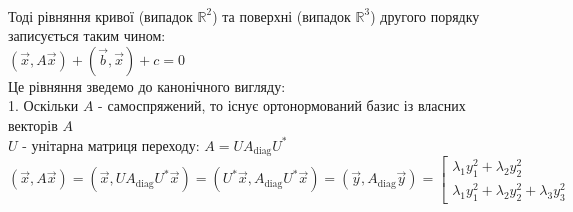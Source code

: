 \documentclass[a4paper, 14pt]{extarticle}
\def\bigline{\vspace{5mm}\\}
\begin{document}
\bigline
Тоді рівняння кривої (випадок $\mathbb{R}^2$) та поверхні (випадок $\mathbb{R}^3$) другого порядку записується таким чином:\\
$(\vec{x}, A \vec{x}) + (\vec{b}, \vec{x}) + c = 0$\\
Це рівняння зведемо до канонічного вигляду:\\
1. Оскільки $A$ - самоспряжений, то існує ортонормований базис із власних векторів $A$\\
$U$ - унітарна матриця переходу: $A = U A_{\textrm{diag}} U^*$\\
$(\vec{x}, A\vec{x}) = (\vec{x}, U A_{\textrm{diag}} U^* \vec{x}) = (U^* \vec{x}, A_{\textrm{diag}} U^* \vec{x}) = (\vec{y}, A_{\textrm{diag}} \vec{y}) = \left[ \begin{gathered} \lambda_1 y_1^2 + \lambda_2 y_2^2 \\
\lambda_1 y_1^2 + \lambda_2 y_2^2 + \lambda_3 y_3^2
 \end{gathered} \right.$
\end{document}
